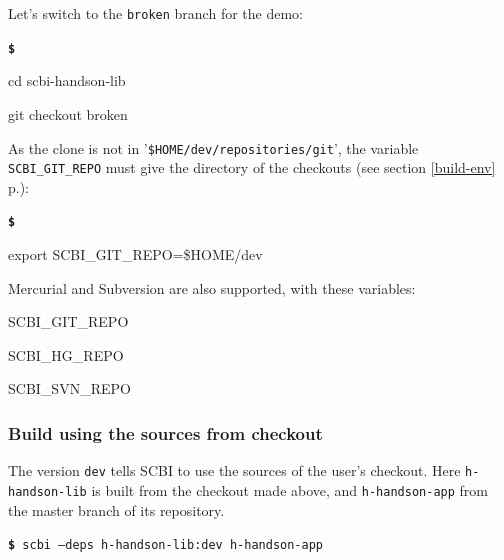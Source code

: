 \documentclass[a4paper,12pt,twoside]{article}
\newenvironment{shellcommand}{
	\begin{list}{ %
			\bfseries\texttt \$
		}{ %
			\ttfamily
			\setlength{\topsep}{-0.3ex}
			\setlength{\labelwidth}{1in}
			\setlength{\leftmargin}{0.7in}
			\setlength{\labelsep}{0.5ex}
			\setlength{\rightmargin}{0.5in}
			\setlength{\itemsep}{1ex}
			\setlength{\parsep}{0ex}
			\setlength{\listparindent}{0.5in}
		}
	}{
	\end{list}
}
\newcommand{\code}[1]{\texttt{#1}}
\newcommand{\seeref}[1]{see section \ref{#1} p.\pageref{#1}}
\newcommand{\file}[1]{'{\texttt{#1}}'}
\newcommand{\cmd}[1]{\tabto{1cm}\hspace{0.5cm}\texttt{\textbf{\$} #1}}
\begin{document}
Let's switch to the \code{broken} branch for the demo:

\begin{shellcommand}
	\item cd scbi-handson-lib
	\item git checkout broken
\end{shellcommand}

As the clone is not in \file{\$HOME/dev/repositories/git}, the variable \code{SCBI\_GIT\_REPO} must give the directory of the checkouts (\seeref{build-env}):

\begin{shellcommand}
	\item export SCBI\_GIT\_REPO=\$HOME/dev
\end{shellcommand}

Mercurial and Subversion are also supported, with these variables:

\begin{description}[style=standard]
	\item[Git] \tabto{3cm} SCBI\_GIT\_REPO
	\item[Mercurial] \tabto{3cm} SCBI\_HG\_REPO
	\item[Subversion] \tabto{3cm} SCBI\_SVN\_REPO
\end{description}

\subsubsection{Build using the sources from checkout}

The version \code{dev} tells SCBI to use the sources of the user's checkout. Here \code{h-handson-lib} is built from the checkout made above, and \code{h-handson-app} from the master branch of its repository.

\cmd{scbi --deps h-handson-lib:dev h-handson-app}
\end{document}
